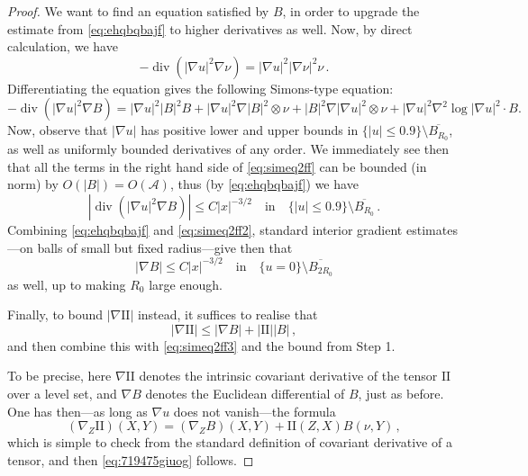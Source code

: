 \documentclass{article}
\theoremstyle{definition}
\begin{document}
\begin{proof}
We want to find an equation satisfied by $B$, in order to upgrade the estimate from \eqref{eq:ehqbqbajf} to higher derivatives as well. Now, by direct calculation, we have
\begin{equation}\label{eq:div2fundf}
    -\operatorname{div}(|\nabla u|^2 \nabla \nu) = |\nabla u|^2 |\nabla \nu|^2 \nu\,.
\end{equation}
Differentiating the equation gives the following Simons-type equation:
\begin{equation}\label{eq:simeq2ff}
-\operatorname{div}(|\nabla u|^2 \nabla B) = |\nabla u|^2 |B|^2 B + |\nabla u|^2 \nabla |B|^2 \otimes \nu + |B|^2 \nabla |\nabla u|^2 \otimes \nu + |\nabla u|^2 \nabla^2 \log |\nabla u|^2 \cdot B.    
\end{equation}
Now, observe that $|\nabla u|$ has positive lower and upper bounds in $\{|u|\leq 0.9\}\setminus \overline{B_{R_0}}$, as well as uniformly bounded derivatives of any order. We immediately see then that all the terms in the right hand side of \eqref{eq:simeq2ff} can be bounded (in norm) by $O(|B|)=O(\mathcal A)$, thus (by \eqref{eq:ehqbqbajf}) we have
\begin{equation}\label{eq:simeq2ff2}
|\operatorname{div}(|\nabla u|^2 \nabla B)| \leq C|x|^{-3/2}\quad\mbox{in}\quad \{|u|\leq 0.9\}\setminus \overline{B_{R_0}}\,.    
\end{equation}
Combining \eqref{eq:ehqbqbajf} and \eqref{eq:simeq2ff2}, standard interior gradient estimates---on balls of small but fixed radius---give then that
\begin{equation}\label{eq:simeq2ff3}
|\nabla B| \leq C|x|^{-3/2}\quad\mbox{in}\quad \{u=0\}\setminus \overline{B_{2R_0}}
\end{equation}
as well, up to making $R_0$ large enough.

Finally, to bound $|\nabla \mathrm{II}|$ instead, it suffices to realise that
\begin{equation}\label{eq:719475giuog}
    |\nabla \mathrm{II}|\leq |\nabla B|+|\mathrm{II}||B|\,,
\end{equation}
and then combine this with \eqref{eq:simeq2ff3} and the bound from Step 1.

To be precise, here $\nabla \mathrm{II}$ denotes the intrinsic covariant derivative of the tensor $\mathrm{II}$ over a level set, and $\nabla B$ denotes the Euclidean differential of $B$, just as before.  One has then---as long as $\nabla u$ does not vanish---the formula
$$
(\nabla_Z \mathrm{II})(X,Y)=(\nabla_Z B)(X,Y)+\mathrm{II}(Z,X)B(\nu,Y)\,,
$$
which is simple to check from the standard definition of covariant derivative of a tensor, and then \eqref{eq:719475giuog} follows.
\end{proof}
\end{document}

